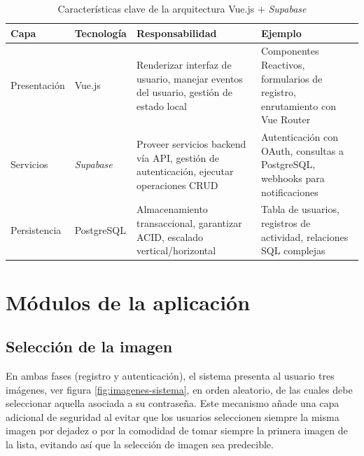\begin{table}[ht]
	\centering
	\caption{Características clave de la arquitectura Vue.js + \textit{Supabase} }
	\label{tab:arquitectura}
	\begin{tabular}{|p{2.1cm}|p{2cm}|p{5cm}|p{5cm}|} %
		\hline
		\rowcolor{gray!20} %
		\textbf{Capa} & \textbf{Tecnología} & \textbf{Responsabilidad} & \textbf{Ejemplo} \\
		\hline
		
		Presentación & Vue.js & 
		Renderizar interfaz de usuario, manejar eventos del usuario, gestión de estado local & 
		Componentes Reactivos, formularios de registro, enrutamiento con Vue Router \\
		\hline
		
		Servicios & \textit{Supabase}  & 
		Proveer servicios backend vía API, gestión de autenticación, ejecutar operaciones CRUD & 
		Autenticación con OAuth, consultas a PostgreSQL, webhooks para notificaciones \\
		\hline
		
		Persistencia & PostgreSQL & 
		Almacenamiento transaccional, garantizar ACID, escalado vertical/horizontal & 
		Tabla de usuarios, registros de actividad, relaciones SQL complejas \\
		\hline
	\end{tabular}
\end{table}


\section{M\'odulos de la aplicaci\'on}

\subsection{Selección de la imagen}
\label{subsec:seleccion-imagen}

En ambas fases (registro y autenticación), el sistema presenta al usuario tres imágenes, ver figura \ref{fig:imagenes-sistema}, en orden aleatorio, de las cuales debe seleccionar aquella asociada a su contraseña. Este mecanismo añade una capa adicional de seguridad al evitar que los usuarios seleccionen siempre la misma imagen por dejadez o por la comodidad de tomar siempre la primera imagen de la lista, evitando as\'i que la selecci\'on de imagen sea predecible. 


